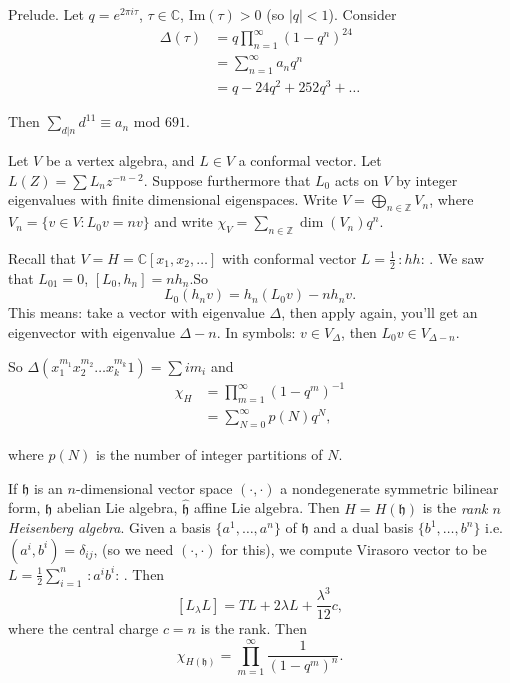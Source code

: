 \medskip\noindent
Prelude. Let $q=e^{2\pi i\tau}$, $\tau \in \mathbb{C}$,
$\text{Im}(\tau)>0$ (so  $|q|<1$).
Consider
\begin{align*}
\Delta(\tau)&=q\prod_{n=1}^\infty(1-q^n)^{24}\\
&=\sum_{n=1}^\infty a_n q^n\\
&=q-24q^2+252q^3+\ldots
\end{align*}

\noindent
Then $\sum_{d|n}d^{11}\equiv a_n\text{ mod }691$.

\medskip\noindent
Let $V$ be a vertex algebra,
and $L \in V$ a conformal vector.
Let $L(Z)=\sum L_nz^{-n-2}$.
Suppose furthermore that $L_0$ acts on $V$ 
by integer eigenvalues with finite dimensional eigenspaces.
Write $V=\bigoplus_{n \in \mathbb{Z}}V_n$,
where $V_n=\{v \in V:L_0v=nv\}$
and write $\chi_V = \sum_{n \in \mathbb{Z}}\dim(V_n)q^n$.

\begin{example}
\label{example-heisenberg-character}
Recall that $V=H=\mathbb{C}[x_1,x_2,\ldots]$
with conformal vector $L=\frac{1}{2}\,:\!hh\!:\,$.
We saw that $L_01=0$, $[L_0,h_n]=nh_n$.So
$$
L_0(h_nv)=h_n(L_0v)-nh_nv.
$$
This means: take a vector with eigenvalue $\Delta$,
then apply again, you'll get an eigenvector with eigenvalue
$\Delta-n$. In symbols: $v \in V_\Delta$, then
$L_0v \in V_{\Delta-n}$.

So $\Delta(x_1^{m_1}x_2^{m_2}\ldots x_k^{m_k}1)=\sum i m_i$
and 
\begin{align*}
\chi_H&=\prod_{m=1}^\infty(1-q^m)^{-1}\\
&=\sum_{N=0}^\infty p(N)q^N,
\end{align*}

\noindent
where $p(N)$ is the number of integer partitions of $N$.
\end{example}

\begin{example}
\label{example-rank-n-heisenberg}
If $\mathfrak{h}$ is an $n$-dimensional vector space
$(\cdot,\cdot)$ a nondegenerate symmetric bilinear form,
$\mathfrak{h}$ abelian Lie algebra, $\hat{\mathfrak{h}}$ 
affine Lie algebra. Then $H=H(\mathfrak{h})$ 
is the {\it rank $n$ Heisenberg algebra}.
Given a basis $\{a^1,\ldots,a^n\}$ of $\mathfrak{h}$ 
and a dual basis $\{b^1,\ldots,b^n\}$
i.e. $(a^i,b^i)=\delta_{ij}$,
(so we need $(\cdot,\cdot)$ for this),
we compute Virasoro vector to be
$L=\frac{1}{2}\sum_{i=1}^n\,:\!a^ib^i\!:\,$.
Then
$$
[L_\lambda L]=TL+2\lambda L+\frac{\lambda^3}{12}c,
$$
where the central charge $c=n$ is the rank.
Then
$$
\chi_{H(\mathfrak{h})}=\prod_{m=1}^\infty
\frac{1}{(1-q^m)^n}.
$$
\end{example}

